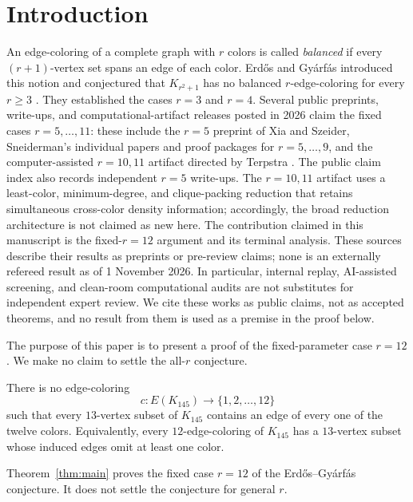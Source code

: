 \section{Introduction}
\label{sec:introduction}

An edge-coloring of a complete graph with $r$ colors is called \emph{balanced} if every $(r+1)$-vertex set spans an edge of each color. Erd\H{o}s and Gy\'arf\'as introduced this notion and conjectured that $K_{r^2+1}$ has no balanced $r$-edge-coloring for every $r\geq3$ \cite{ErdosGyarfas1999}. They established the cases $r=3$ and $r=4$. Several public preprints, write-ups, and computational-artifact releases posted in 2026 claim the fixed cases $r=5,\ldots,11$: these include the $r=5$ preprint of Xia and Szeider, Sneiderman's individual papers and proof packages for $r=5,\ldots,9$, and the computer-assisted $r=10,11$ artifact directed by Terpstra \cite{XiaSzeider2026,SneidermanFixedCases2026,Terpstra2026FixedCases,Erdos617Claims2026}. The public claim index also records independent $r=5$ write-ups. The $r=10,11$ artifact uses a least-color, minimum-degree, and clique-packing reduction that retains simultaneous cross-color density information; accordingly, the broad reduction architecture is not claimed as new here. The contribution claimed in this manuscript is the fixed-$r=12$ argument and its terminal analysis. These sources describe their results as preprints or pre-review claims; none is an externally refereed result as of 1 November 2026. In particular, internal replay, AI-assisted screening, and clean-room computational audits are not substitutes for independent expert review. We cite these works as public claims, not as accepted theorems, and no result from them is used as a premise in the proof below.

The purpose of this paper is to present a proof of the fixed-parameter case $r=12$. We make no claim to settle the all-$r$ conjecture.

\begin{theorem}
\label{thm:main}
There is no edge-coloring
\[
c:E(K_{145})\longrightarrow\{1,2,\ldots,12\}
\]
such that every $13$-vertex subset of $K_{145}$ contains an edge of every one of the twelve colors. Equivalently, every $12$-edge-coloring of $K_{145}$ has a $13$-vertex subset whose induced edges omit at least one color.
\end{theorem}

Theorem~\ref{thm:main} proves the fixed case $r=12$ of the Erd\H{o}s--Gy\'arf\'as conjecture. It does not settle the conjecture for general $r$.


